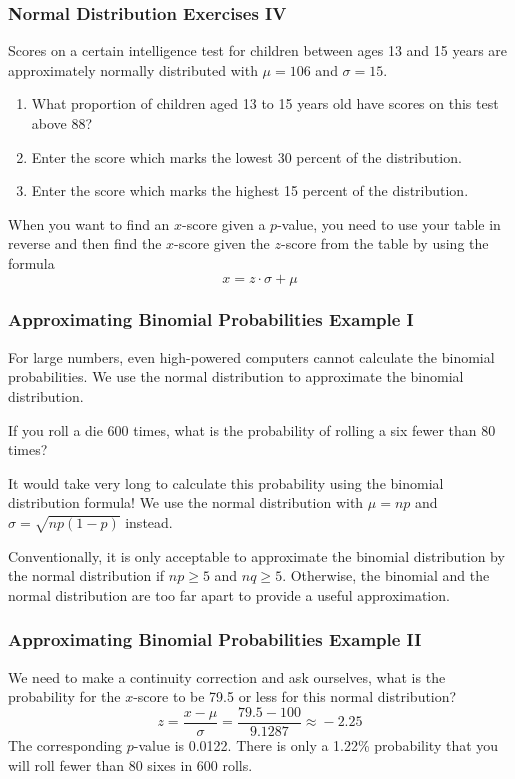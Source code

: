 \documentclass[xcolor=dvipsnames]{beamer}
\begin{document}
\begin{frame}
  \frametitle{Normal Distribution Exercises IV}
  {\ubung} Scores on a certain intelligence test for children between
  ages 13 and 15 years are approximately normally distributed with
  $\mu=106$ and $\sigma=15$.
  \begin{enumerate}
  \item What proportion of children aged 13 to 15 years old have
    scores on this test above 88?
  \item Enter the score which marks the lowest 30 percent of the
    distribution.
  \item Enter the score which marks the highest 15 percent of the
    distribution.
  \end{enumerate}
When you want to find an $x$-score given a $p$-value, you need to use
your table in reverse and then find the $x$-score given the $z$-score
from the table by using the formula
\begin{equation}
  \label{eq:aedecaba}
  x=z\cdot\sigma+\mu
\end{equation}
\end{frame}
\begin{frame}
  \frametitle{Approximating Binomial Probabilities Example I}
  For large numbers, even high-powered computers cannot calculate the
  binomial probabilities. We use the normal distribution to
  approximate the binomial distribution. 

\bigskip

   If you roll a die 600 times, what is the
  probability of rolling a six fewer than 80 times? 

\bigskip

  It would take very long to calculate this probability using the
  binomial distribution formula! We use the normal distribution with
  $\mu=np$ and $\sigma=\sqrt{np(1-p)}$ instead. 

\bigskip

  Conventionally, it is only acceptable to approximate the binomial
  distribution by the normal distribution if $np\geq{}5$ and
  $nq\geq{}5$. Otherwise, the binomial and the normal distribution are
  too far apart to provide a useful approximation.
\end{frame}

\begin{frame}
  \frametitle{Approximating Binomial Probabilities Example II}
  We need to make a \alert{continuity correction} and ask ourselves,
  what is the probability for the $x$-score to be 79.5 or less for
  this normal distribution?
  \begin{equation}
    \label{eq:oolojuth}
    z=\frac{x-\mu}{\sigma}=\frac{79.5-100}{9.1287}\approx{}-2.25
  \end{equation}
  The corresponding $p$-value is 0.0122. There is only a 1.22\%
  probability that you will roll fewer than 80 sixes in 600 rolls.
\end{frame}
\end{document}
